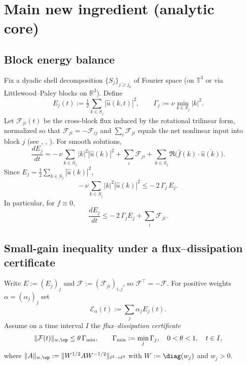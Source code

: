 \IfFileExists{nyjm.cls}{\documentclass[11pt]{nyjm}}{\documentclass[11pt]{amsart}}
\newcommand{\R}{\mathbb{R}}
\newcommand{\T}{\mathbb{T}}
\theoremstyle{plain}
\theoremstyle{definition}
\theoremstyle{remark}
\begin{document}
\section{Main new ingredient (analytic core)}\label{sec:analytic-core}

\subsection{Block energy balance}\label{subsec:block-balance}
Fix a dyadic shell decomposition $\{S_j\}_{j\ge j_0}$ of Fourier space (on $\T^3$ or via Littlewood–Paley blocks on $\R^3$). Define
\[
E_j(t):=\tfrac12\sum_{k\in S_j} |\widehat u(k,t)|^2,
\qquad
\Gamma_j:=\nu\min_{k\in S_j}|k|^2.
\]
Let $\mathcal F_{ji}(t)$ be the cross-block flux induced by the rotational trilinear form, normalized so that $\mathcal F_{ji}=-\mathcal F_{ij}$ and $\sum_i\mathcal F_{ji}$ equals the net nonlinear input into block $j$ (see \cite[Ch.~3]{ConstantinFoias1988}, \cite[Ch.~II]{Temam2001}, \cite[Ch.~6]{Frisch1995}). For smooth solutions,
\begin{equation}\label{eq:block-balance}
\frac{dE_j}{dt}
= -\,\nu\!\!\sum_{k\in S_j}\!|k|^2|\widehat u(k)|^2
+ \sum_{i}\mathcal F_{ji}
+ \sum_{k\in S_j}\Re\big(\widehat f(k)\cdot \overline{\widehat u(k)}\big).
\end{equation}
Since $E_j=\tfrac12\sum_{k\in S_j}|\widehat u(k)|^2$,
\begin{equation}\label{eq:diss-lower}
-\,\nu\!\!\sum_{k\in S_j}\!|k|^2|\widehat u(k)|^2 \le -\,2\,\Gamma_j\,E_j.
\end{equation}
In particular, for $f\equiv0$,
\begin{equation}\label{eq:block-balance-ineq}
\frac{dE_j}{dt}\le -\,2\,\Gamma_j E_j + \sum_i \mathcal F_{ji}.
\end{equation}

\subsection{Small-gain inequality under a flux–dissipation certificate}\label{subsec:small-gain}
Write $E:=(E_j)_j$ and $\mathcal F:=(\mathcal F_{ji})_{i,j}$, so $\mathcal F^\top=-\mathcal F$. For positive weights $\alpha=(\alpha_j)_j$ set
\[
\mathcal E_\alpha(t):=\sum_j \alpha_j E_j(t).
\]
Assume on a time interval $I$ the \emph{flux–dissipation certificate}
\begin{equation}\label{eq:certificate}
\|\mathcal F(t)\|_{w,\op}\le \theta\,\Gamma_{\min},\qquad
\Gamma_{\min}:=\min_j\Gamma_j,\quad 0<\theta<1,\quad t\in I,
\end{equation}
where $\|A\|_{w,\op}:=\|W^{1/2}AW^{-1/2}\|_{\ell^2\to\ell^2}$ with $W:=\diag(w_j)$ and $w_j>0$.
\end{document}
